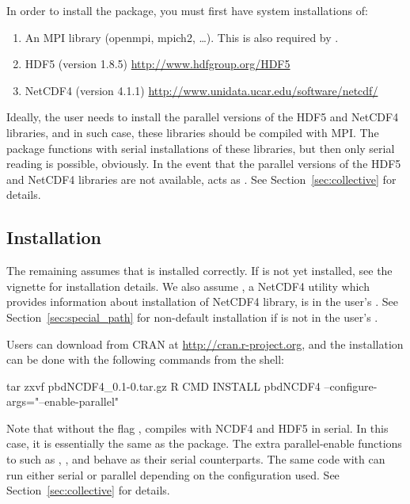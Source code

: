In order to install the  package, you must first have system installations of:
\begin{enumerate}
  \item An MPI library (openmpi, mpich2, \dots).  This is also required by .
  \item HDF5 (version 1.8.5) \url{http://www.hdfgroup.org/HDF5}
  \item NetCDF4 (version 4.1.1) \url{http://www.unidata.ucar.edu/software/netcdf/}
\end{enumerate}

Ideally, the user needs to install the parallel versions of the HDF5 and NetCDF4 libraries, and in such case, these libraries should be compiled with MPI.  The  package functions with serial installations of these libraries, but then only serial reading is possible, obviously.  In the event that the parallel versions of the HDF5 and NetCDF4 libraries are not available,  acts as . See Section~\ref{sec:collective} for details.




\subsection[Installation]{Installation}
\label{sec:installation}

The remaining assumes that  is installed correctly.
If  is not yet installed, see the 
vignette for installation details.
We also assume , a NetCDF4 utility which provides information about installation of NetCDF4 library, is in the user's .  See Section~\ref{sec:special_path} for non-default installation if  is not in the user's .

Users can download  from CRAN at
\url{http://cran.r-project.org}, and
the installation can be done with the following commands from the shell:
\begin{Command}
tar zxvf pbdNCDF4_0.1-0.tar.gz
R CMD INSTALL pbdNCDF4 --configure-args="--enable-parallel"
\end{Command}

Note that without the flag
,
 compiles with NCDF4 and HDF5 in serial.  In this case, it is essentially the same as the  package.
The extra parallel-enable  functions to 
such as ,
, and  behave as their serial counterparts.
The same  code with 
can run either serial or parallel depending on the configuration used.
See Section~\ref{sec:collective} for details.



